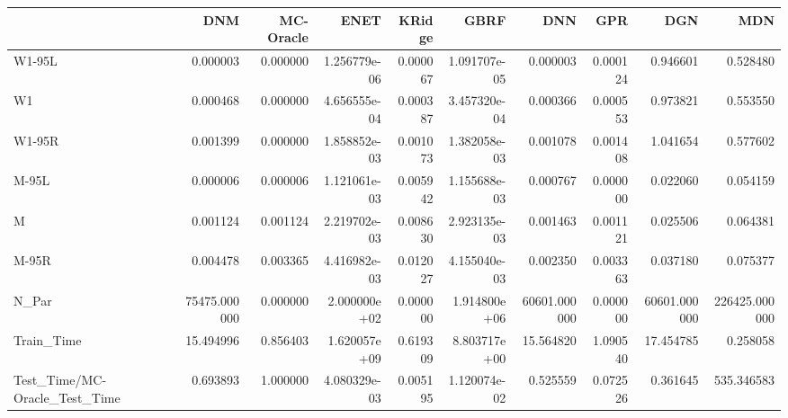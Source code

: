 \begin{tabular}{lrrrrrrrrr}
\toprule
{} &           DNM &  MC-Oracle &          ENET &    KRidge &          GBRF &           DNN &       GPR &           DGN &            MDN \\
\midrule
W1-95L                        &      0.000003 &   0.000000 &  1.256779e-06 &  0.000067 &  1.091707e-05 &      0.000003 &  0.000124 &      0.946601 &       0.528480 \\
W1                            &      0.000468 &   0.000000 &  4.656555e-04 &  0.000387 &  3.457320e-04 &      0.000366 &  0.000553 &      0.973821 &       0.553550 \\
W1-95R                        &      0.001399 &   0.000000 &  1.858852e-03 &  0.001073 &  1.382058e-03 &      0.001078 &  0.001408 &      1.041654 &       0.577602 \\
M-95L                         &      0.000006 &   0.000006 &  1.121061e-03 &  0.005942 &  1.155688e-03 &      0.000767 &  0.000000 &      0.022060 &       0.054159 \\
M                             &      0.001124 &   0.001124 &  2.219702e-03 &  0.008630 &  2.923135e-03 &      0.001463 &  0.001121 &      0.025506 &       0.064381 \\
M-95R                         &      0.004478 &   0.003365 &  4.416982e-03 &  0.012027 &  4.155040e-03 &      0.002350 &  0.003363 &      0.037180 &       0.075377 \\
N\_Par                         &  75475.000000 &   0.000000 &  2.000000e+02 &  0.000000 &  1.914800e+06 &  60601.000000 &  0.000000 &  60601.000000 &  226425.000000 \\
Train\_Time                    &     15.494996 &   0.856403 &  1.620057e+09 &  0.619309 &  8.803717e+00 &     15.564820 &  1.090540 &     17.454785 &       0.258058 \\
Test\_Time/MC-Oracle\_Test\_Time &      0.693893 &   1.000000 &  4.080329e-03 &  0.005195 &  1.120074e-02 &      0.525559 &  0.072526 &      0.361645 &     535.346583 \\
\bottomrule
\end{tabular}
